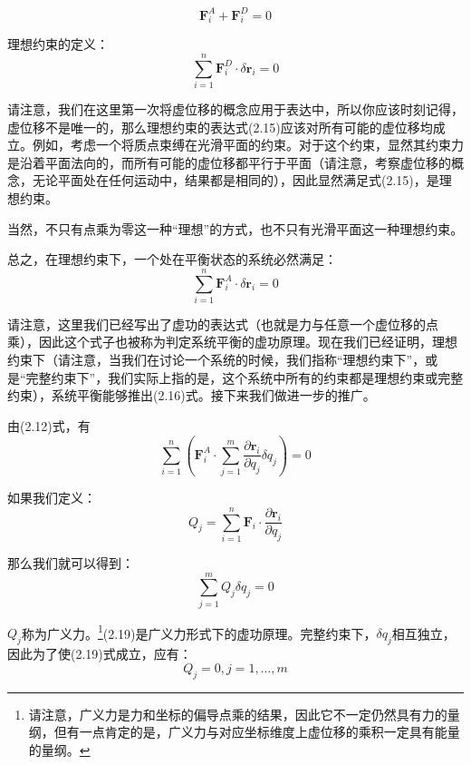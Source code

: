 \documentclass[a4paper, 10pt, openany]{book}%
\begin{document}
   \begin{equation}
     \textbf{F}^A_i+\textbf{F}^D_i=0
    \end{equation}

   理想约束的定义：
   \begin{equation}
    \sum_{i=1}^n \textbf{F}^D_i\cdot\delta \textbf{r}_i=0
   \end{equation}

请注意，我们在这里第一次将虚位移的概念应用于表达中，所以你应该时刻记得，虚位移不是唯一的，那么理想约束的表达式(2.15)应该对所有可能的虚位移均成立。例如，考虑一个将质点束缚在光滑平面的约束。对于这个约束，显然其约束力是沿着平面法向的，而所有可能的虚位移都平行于平面（请注意，考察虚位移的概念，无论平面处在任何运动中，结果都是相同的），因此显然满足式(2.15)，是理想约束。

当然，不只有点乘为零这一种“理想”的方式，也不只有光滑平面这一种理想约束。




   总之，在理想约束下，一个处在平衡状态的系统必然满足：
   \begin{equation}
    \sum_{i=1}^n \textbf{F}^A_i\cdot\delta \textbf{r}_i=0
   \end{equation}
   
   请注意，这里我们已经写出了虚功的表达式（也就是力与任意一个虚位移的点乘），因此这个式子也被称为判定系统平衡的虚功原理。现在我们已经证明，理想约束下（请注意，当我们在讨论一个系统的时候，我们指称“理想约束下”，或是“完整约束下”，我们实际上指的是，这个系统中所有的约束都是理想约束或完整约束），系统平衡能够推出(2.16)式。接下来我们做进一步的推广。


   由(2.12)式，有
   \begin{equation}
    \sum_{i=1}^n(\textbf{F}^A_i \cdot \sum_{j=1}^m \frac{\partial \textbf{r}_i}{\partial q_j}\delta q_j)=0
   \end{equation}
  
   如果我们定义：
   \begin{equation}
   Q_j=\sum_{i=1}^n \textbf{F}_i \cdot \frac{\partial \textbf{r}_i}{\partial q_j}
   \end{equation}

   那么我们就可以得到：
   \begin{equation}
    \sum_{j=1}^m Q_j \delta q_j=0
   \end{equation}
   
   $Q_j$称为广义力。\footnote{请注意，广义力是力和坐标的偏导点乘的结果，因此它不一定仍然具有力的量纲，但有一点肯定的是，广义力与对应坐标维度上虚位移的乘积一定具有能量的量纲。}(2.19)是广义力形式下的虚功原理。完整约束下，$\delta q_j $相互独立，因此为了使(2.19)式成立，应有：
   \begin{equation}
     Q_j=0,j=1,\dots,m
   \end{equation}
\end{document}
